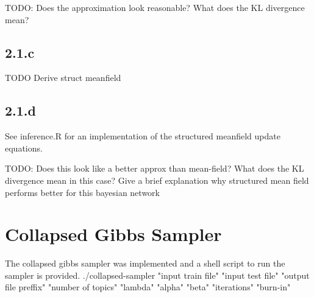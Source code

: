 \documentclass{article}
\begin{document}
TODO: Does the approximation look reasonable? What does the KL divergence mean?

\subsection*{2.1.c}
TODO Derive struct meanfield
\subsection*{2.1.d}
See inference.R for an implementation of the structured meanfield
update equations. 

TODO:
Does this look like a better approx than mean-field?
What does the KL divergence mean in this case?
Give a brief explanation why structured mean field performs 
better for this bayesian network

\section*{Collapsed Gibbs Sampler}
The collapsed gibbs sampler was implemented and a shell script to run the sampler is provided.
./collapsed-sampler "input train file" "input test file" "output file preffix" "number of topics" "lambda" "alpha" "beta" "iterations" "burn-in"
\end{document}
